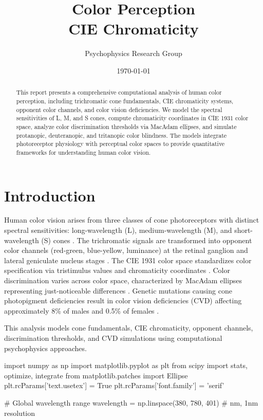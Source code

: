 \documentclass[11pt,a4paper]{article}
\title{Color Perception\\CIE Chromaticity}
\author{Psychophysics Research Group}
\date{\today}
\begin{document}
\maketitle

\begin{abstract}
This report presents a comprehensive computational analysis of human color perception, including trichromatic cone fundamentals, CIE chromaticity systems, opponent color channels, and color vision deficiencies. We model the spectral sensitivities of L, M, and S cones, compute chromaticity coordinates in CIE 1931 color space, analyze color discrimination thresholds via MacAdam ellipses, and simulate protanopic, deuteranopic, and tritanopic color blindness. The models integrate photoreceptor physiology with perceptual color spaces to provide quantitative frameworks for understanding human color vision.
\end{abstract}

\section{Introduction}

Human color vision arises from three classes of cone photoreceptors with distinct spectral sensitivities: long-wavelength (L), medium-wavelength (M), and short-wavelength (S) cones \cite{stockman2000spectral}. The trichromatic signals are transformed into opponent color channels (red-green, blue-yellow, luminance) at the retinal ganglion and lateral geniculate nucleus stages \cite{hurvich1957opponent}. The CIE 1931 color space standardizes color specification via tristimulus values and chromaticity coordinates \cite{wyszecki2000color}. Color discrimination varies across color space, characterized by MacAdam ellipses representing just-noticeable differences \cite{macadam1942visual}. Genetic mutations causing cone photopigment deficiencies result in color vision deficiencies (CVD) affecting approximately 8\% of males and 0.5\% of females \cite{sharpe1999opsin}.

This analysis models cone fundamentals, CIE chromaticity, opponent channels, discrimination thresholds, and CVD simulations using computational psychophysics approaches.

\begin{pycode}

import numpy as np
import matplotlib.pyplot as plt
from scipy import stats, optimize, integrate
from matplotlib.patches import Ellipse
plt.rcParams['text.usetex'] = True
plt.rcParams['font.family'] = 'serif'

# Global wavelength range
wavelength = np.linspace(380, 780, 401)  # nm, 1nm resolution

\end{pycode}
\end{document}
